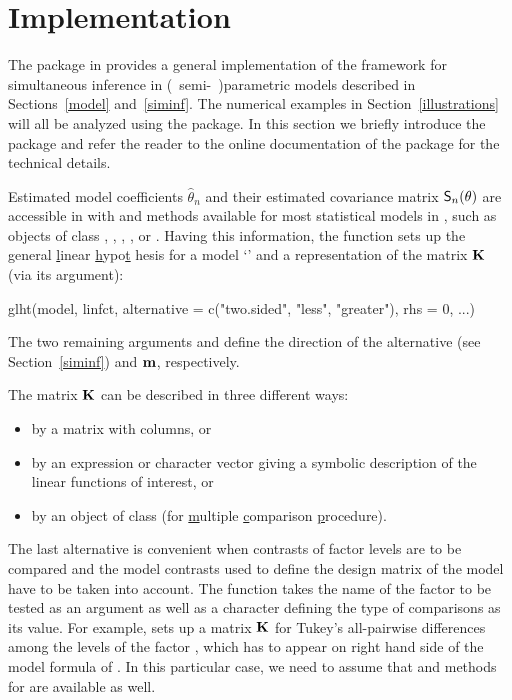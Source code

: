 \documentclass[12pt,a4paper]{article}
\begin{document}
\section{Implementation}

\label{implementation}

The  package \citep{pkg:multcomp} in \RR{} \citep{rcore2007}
provides a general implementation of the framework for simultaneous
inference in (~semi-~)\-parametric models described in Sections~\ref{model}
and~\ref{siminf}. The numerical examples in Section~\ref{illustrations} will
all be analyzed using the  package. In this section we
briefly introduce the  package and refer the reader to
the online documentation of the package for the technical details.

Estimated model coefficients $\hat{\theta}_n$ and their estimated covariance matrix $%
\S_n(\theta)$ are accessible in \RR{} with  and 
methods available for most statistical models in \RR, such as objects of
class , , , ,  or %
. Having this information, the  function sets
up the \underline{g}eneral \underline{l}inear \underline{h}ypo\underline{t}%
hesis for a model `' and a representation of the matrix $\mathbf{K}$
(via its  argument): 
\begin{Sinput}
glht(model, linfct, alternative = c("two.sided", "less", "greater"),
     rhs = 0, ...)
\end{Sinput}
The two remaining arguments  and  define the
direction of the alternative (see Section~\ref{siminf}) and $\mathbf{m}$,
respectively.

The matrix $\mathbf{K}$ can be described in three different ways:

\begin{itemize}
\item by a matrix with  columns, or

\item by an expression or character vector giving a symbolic description  of
the linear functions of interest, or

\item by an object of class   (for \underline{m}ultiple 
\underline{c}omparison \underline{p}rocedure).
\end{itemize}

The last alternative is convenient when contrasts of factor levels are to be
compared and the model contrasts used to define the design matrix of the
model have to be taken into account. The  function takes the
name of the factor to be tested as an argument as well as a character
defining the type of comparisons as its value. For example,  sets up a matrix $\mathbf{K}$ for Tukey's all-pairwise differences among
the levels of the factor , which has to appear on right hand
side of the model formula of . In this particular case, we
need to assume that  and  methods
for  are available as well.
\end{document}
